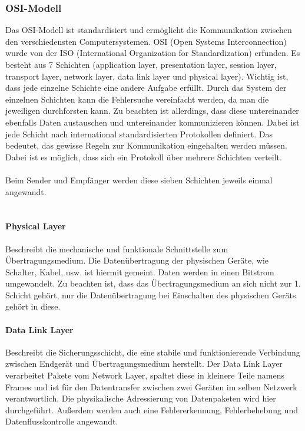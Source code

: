\documentclass[titlepage,12pt,twoside]{article}
\begin{document}
\subsubsection{OSI-Modell}
Das OSI-Modell ist standardisiert und ermöglicht die Kommunikation zwischen den 
verschiedensten Computersystemen. OSI (Open Systems Interconnection) wurde von der 
ISO (International Organization for Standardization) erfunden. 
Es besteht aus 7 Schichten (application layer, presentation layer, session layer, 
transport layer, network layer, data link layer und physical layer). Wichtig ist, 
dass jede einzelne Schichte eine andere Aufgabe erfüllt. Durch das System der 
einzelnen Schichten kann die Fehlersuche vereinfacht werden, da man die jeweiligen 
durchforsten kann. Zu beachten ist allerdings, dass diese untereinander ebenfalls 
Daten austauschen und untereinander kommunizieren können. Dabei ist jede Schicht 
nach international standardisierten Protokollen definiert. Das bedeutet, das gewisse 
Regeln zur Kommunikation eingehalten werden müssen. Dabei ist es möglich, dass sich 
ein Protokoll über mehrere Schichten verteilt. \\
\\
Beim Sender und Empfänger werden diese sieben Schichten jeweils einmal angewandt. \\
\\

\paragraph{Physical Layer}
\hfill \break
\hfill \break
Beschreibt die mechanische und funktionale Schnittstelle zum Übertragungsmedium. Die 
Datenübertragung der physischen Geräte, wie Schalter, Kabel, usw. ist hiermit gemeint. 
Daten werden in einen Bitstrom umgewandelt. Zu beachten ist, dass das Übertragungsmedium 
an sich nicht zur 1. Schicht gehört, nur die Datenübertragung bei Einschalten des 
physischen Geräts gehört in diese.\\

\paragraph{Data Link Layer}
\hfill \break
\hfill \break
Beschreibt die Sicherungsschicht, die eine stabile und funktionierende Verbindung 
zwischen Endgerät und Übertragungsmedium herstellt. Der Data Link Layer verarbeitet 
Pakete vom Network Layer, spaltet diese in kleinere Teile namens Frames und ist für 
den Datentransfer zwischen zwei Geräten im selben Netzwerk verantwortlich. Die 
physikalische Adressierung von Datenpaketen wird hier durchgeführt. Außerdem werden 
auch eine Fehlererkennung, Fehlerbehebung und Datenflusskontrolle angewandt. \\
\end{document}
